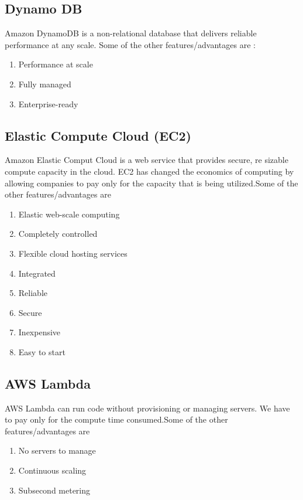 \documentclass[journal]{hybrid-cloud}
\begin{document}
\subsection{Dynamo DB} 
Amazon DynamoDB is a non-relational database that delivers reliable performance at any scale. Some of the other features/advantages are :\cite{DynamoDBDoc}

\begin{enumerate}
	\item Performance at scale
	\item Fully managed
	\item Enterprise-ready
\end{enumerate}

\subsection{Elastic Compute Cloud (EC2)} 
Amazon Elastic Comput Cloud is a web service that provides secure, re sizable compute capacity in the cloud. EC2 has changed the economics of computing by allowing companies to pay only for the capacity that is being utilized.Some of the other features/advantages are \cite{EC2Doc}

\begin{enumerate}
	\item Elastic web-scale computing
	\item Completely controlled
	\item Flexible cloud hosting services
	\item Integrated
	\item Reliable
	\item Secure
	\item Inexpensive
	\item Easy to start
\end{enumerate}

\subsection{AWS Lambda} 
AWS Lambda can run code without provisioning or managing servers. We have to pay only for the compute time consumed.Some of the other features/advantages are \cite{LambdaDoc}

\begin{enumerate}
	\item No servers to manage
	\item Continuous scaling
	\item Subsecond metering
\end{enumerate}
\end{document}
